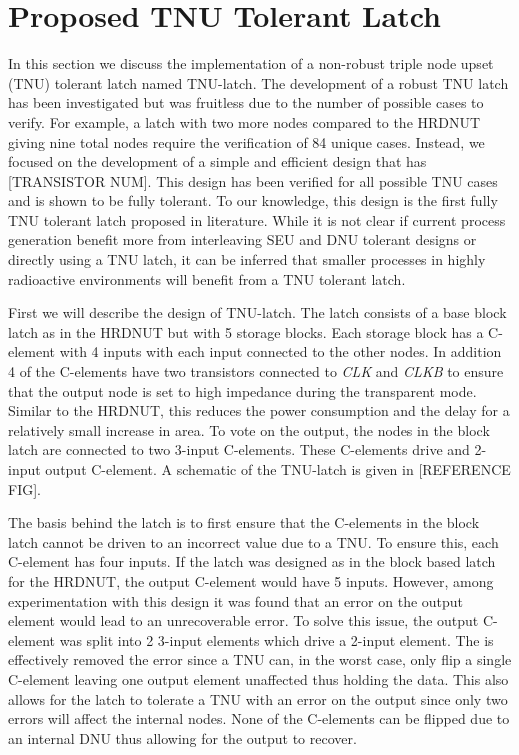 \section{Proposed TNU Tolerant Latch} \label{sec:TNU}

In this section we discuss the implementation of a non-robust triple node upset (TNU) tolerant latch named TNU-latch. The development of a robust TNU latch has been investigated but was fruitless due to the number of possible cases to verify. For example, a latch with two more nodes compared to the HRDNUT giving nine total nodes require the verification of 84 unique cases. Instead, we focused on the development of a simple and efficient design that has [TRANSISTOR NUM]. This design has been verified for all possible TNU cases and is shown to be fully tolerant. To our knowledge, this design is the first fully TNU tolerant latch proposed in literature. While it is not clear if current process generation benefit more from interleaving SEU and DNU tolerant designs or directly using a TNU latch, it can be inferred that smaller processes in highly radioactive environments will benefit from a TNU tolerant latch.

First we will describe the design of TNU-latch. The latch consists of a base block latch as in the HRDNUT but with 5 storage blocks. Each storage block has a C-element with 4 inputs with each input connected to the other nodes. In addition 4 of the C-elements have two transistors connected to \textit{CLK} and \textit{CLKB} to ensure that the output node is set to high impedance during the transparent mode. Similar to the HRDNUT, this reduces the power consumption and the delay for a relatively small increase in area. To vote on the output, the nodes in the block latch are connected to two 3-input C-elements. These C-elements drive and 2-input output C-element. A schematic of the TNU-latch is given in [REFERENCE FIG].



The basis behind the latch is to first ensure that the C-elements in the block latch cannot be driven to an incorrect value due to a TNU. To ensure this, each C-element has four inputs. If the latch was designed as in the block based latch for the HRDNUT, the output C-element would have 5 inputs. However, among experimentation with this design it was found that an error on the output element would lead to an unrecoverable error. To solve this issue, the output C-element was split into 2 3-input elements which drive a 2-input element. The is effectively removed the error since a TNU can, in the worst case, only flip a single C-element leaving one output element unaffected thus holding the data. This also allows for the latch to tolerate a TNU with an error on the output since only two errors will affect the internal nodes. None of the C-elements can be flipped due to an internal DNU thus allowing for the output to recover.

